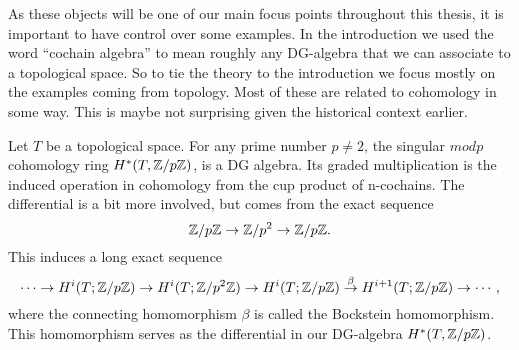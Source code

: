 

As these objects will be one of our main focus points throughout this thesis, it is important to have control over some examples. In the introduction we used the word ``cochain algebra'' to mean roughly any DG-algebra that we can associate to a topological space. So to tie the theory to the introduction we focus mostly on the examples coming from topology. Most of these are related to cohomology in some way. This is maybe not surprising given the historical context earlier. 

\begin{example}
Let $T$ be a topological space. For any prime number $p\neq 2$, the singular $mod p$ cohomology ring $H^*(T, \mathbb{Z}/p\mathbb{Z})$, is a DG algebra. Its graded multiplication is the induced operation in cohomology from the cup product of n-cochains. The differential is a bit more involved, but comes from the exact sequence
\begin{equation*}
\mathbb{Z}/p\mathbb{Z} \rightarrow \mathbb{Z}/p^2 \rightarrow \mathbb{Z}/p\mathbb{Z}.
\end{equation*}    
This induces a long exact sequence 
\begin{equation*}
    \cdots \rightarrow H^i(T; \mathbb{Z}/p\mathbb{Z}) \rightarrow H^i(T; \mathbb{Z}/p^2\mathbb{Z}) \rightarrow H^i(T; \mathbb{Z}/p\mathbb{Z}) \overset{\beta}\rightarrow H^{i+1}(T; \mathbb{Z}/p\mathbb{Z}) \rightarrow \cdots, 
\end{equation*}
where the connecting homomorphism $\beta$ is called the Bockstein homomorphism. This homomorphism serves as the differential in our DG-algebra $H^*(T, \mathbb{Z}/p\mathbb{Z})$. 
\end{example}

